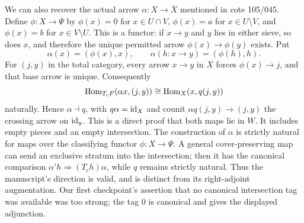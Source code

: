 We can also recover the actual arrow $\alpha:X\to\overline X$ mentioned in cote 105/045. Define $\phi:X\to\Psi$ by $\phi(x)=0$ for $x\in U\cap V$, $\phi(x)=a$ for $x\in U\setminus V$, and $\phi(x)=b$ for $x\in V\setminus U$. This is a functor: if $x\to y$ and $y$ lies in either sieve, so does $x$, and therefore the unique permitted arrow $\phi(x)\to\phi(y)$ exists. Put
\[
 \alpha(x)=(\phi(x),x),\qquad
 \alpha(h:x\to y)=(\phi(h),h).
\]
For $(j,y)$ in the total category, every arrow $x\to y$ in $X$ forces $\phi(x)\to j$, and that base arrow is unique. Consequently
\[
 \operatorname{Hom}_{T_cF}(\alpha x,(j,y))\cong\operatorname{Hom}_X(x,q(j,y))
\]
naturally. Hence $\alpha\dashv q$, with $q\alpha=\operatorname{id}_X$ and counit $\alpha q(j,y)\to(j,y)$ the crossing arrow on $\operatorname{id}_y$. This is a direct proof that both maps lie in $W$. It includes empty pieces and an empty intersection. The construction of $\alpha$ is strictly natural for maps over the classifying functor $\phi:X\to\Psi$. A general cover-preserving map can send an exclusive stratum into the intersection; then it has the canonical comparison $\alpha' h\Rightarrow (T_ch)\alpha$, while $q$ remains strictly natural. Thus the manuscript's direction is valid, and is distinct from its right-adjoint augmentation. Our first checkpoint's assertion that no canonical intersection tag was available was too strong; the tag $0$ is canonical and gives the displayed adjunction.

